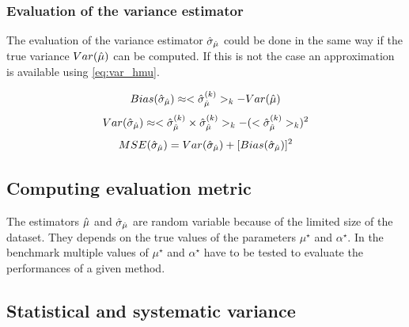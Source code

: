 \subsubsection{Evaluation of the variance estimator} %
\label{ssub:evaluation_of_the_variance_estimator}


The evaluation of the variance estimator $\hat\sigma_{\hat\mu}$ could be done in the same way if the true variance $Var(\hat\mu)$ can be computed.
If this is not the case an approximation is available using \autoref{eq:var_hmu}.

\begin{equation}
  Bias(\hat\sigma_{\hat\mu}) \approx <\hat\sigma_{\hat\mu}^{(k)}>_k - Var(\hat\mu)
\end{equation}
\begin{equation}
  Var(\hat\sigma_{\hat\mu}) \approx <\hat\sigma_{\hat\mu}^{(k)} \times \hat\sigma_{\hat\mu}^{(k)}>_k - (<\hat\sigma_{\hat\mu}^{(k)}>_k)^2
\end{equation}
\begin{equation}
  MSE(\hat\sigma_{\hat\mu}) = Var(\hat\sigma_{\hat\mu}) + [Bias(\hat\sigma_{\hat\mu})]^2
\end{equation}










\subsection{Computing evaluation metric} %
\label{sub:computing_evaluation_metric}



The estimators $\hat\mu$ and $\hat\sigma_{\hat\mu}$ are random variable because of the limited size of the dataset.
They depends on the true values of the parameters $\mu^\star$ and $\alpha^\star$.
In the benchmark multiple values of $\mu^\star$ and $\alpha^\star$ have to be tested to evaluate the performances of a given method.










\subsection{Statistical and systematic variance} %
\label{sub:statistical_and_systematic_variance}

